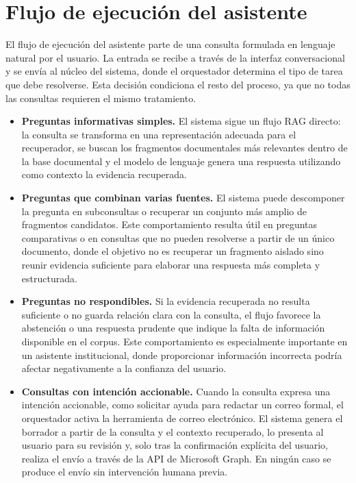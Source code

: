 \section{Flujo de ejecución del asistente}\label{sec:flujo-ejecucion}

El flujo de ejecución del asistente parte de una consulta formulada en lenguaje natural por el usuario. 
La entrada se recibe a través de la interfaz conversacional y se envía al núcleo del sistema, donde el orquestador determina el tipo de tarea que debe resolverse. 
Esta decisión condiciona el resto del proceso, ya que no todas las consultas requieren el mismo tratamiento.

\begin{itemize}
    \item \textbf{Preguntas informativas simples.} El sistema sigue un flujo RAG directo: la consulta se transforma en una representación adecuada para el recuperador, se buscan los fragmentos documentales más relevantes dentro de la base documental y el modelo de lenguaje genera una respuesta utilizando como contexto la evidencia recuperada.

    \item \textbf{Preguntas que combinan varias fuentes.} El sistema puede descomponer la pregunta en subconsultas o recuperar un conjunto más amplio de fragmentos candidatos. Este comportamiento resulta útil en preguntas comparativas o en consultas que no pueden resolverse a partir de un único documento, donde el objetivo no es recuperar un fragmento aislado sino reunir evidencia suficiente para elaborar una respuesta más completa y estructurada.

    \item \textbf{Preguntas no respondibles.} Si la evidencia recuperada no resulta suficiente o no guarda relación clara con la consulta, el flujo favorece la abstención o una respuesta prudente que indique la falta de información disponible en el corpus. Este comportamiento es especialmente importante en un asistente institucional, donde proporcionar información incorrecta podría afectar negativamente a la confianza del usuario.

    \item \textbf{Consultas con intención accionable.} Cuando la consulta expresa una intención accionable, como solicitar ayuda para redactar un correo formal, el orquestador activa la herramienta de correo electrónico. El sistema genera el borrador a partir de la consulta y el contexto recuperado, lo presenta al usuario para su revisión y, solo tras la confirmación explícita del usuario, realiza el envío a través de la API de Microsoft Graph. En ningún caso se produce el envío sin intervención humana previa.
\end{itemize}

